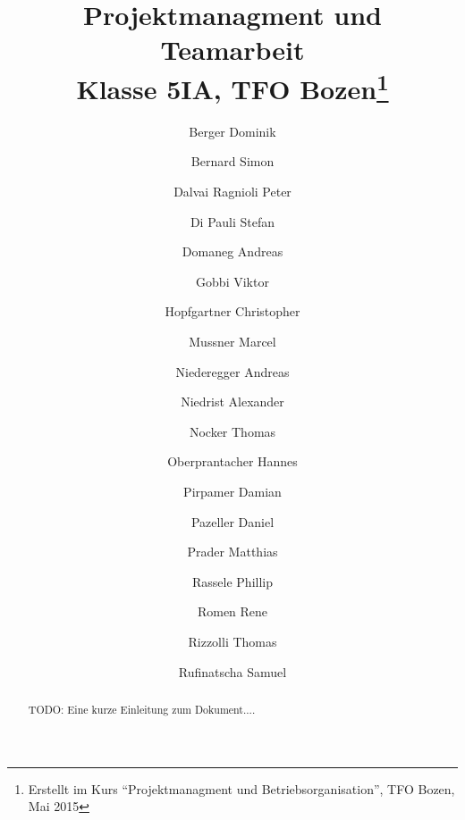 \documentclass{article}
\title{Projektmanagment und Teamarbeit\\Klasse 5IA, TFO Bozen\thanks{Erstellt 
im Kurs ``Projektmanagment und Betriebsorganisation'', TFO Bozen, Mai 2015}}
\author{Berger Dominik
\and Bernard Simon
\and Dalvai Ragnioli Peter
\and Di Pauli Stefan
\and Domaneg Andreas
\and Gobbi Viktor
\and Hopfgartner Christopher
\and Mussner Marcel
\and Niederegger Andreas
\and Niedrist Alexander
\and Nocker Thomas
\and Oberprantacher Hannes
\and Pirpamer Damian
\and Pazeller Daniel
\and Prader Matthias
\and Rassele Phillip
\and Romen Rene
\and Rizzolli Thomas
\and Rufinatscha Samuel}
\begin{document}
\maketitle


\begin{abstract}
 TODO: Eine kurze Einleitung zum Dokument....
\end{abstract}

\newpage


\begin{sloppypar}
\tableofcontents
\listoffigures























\end{sloppypar}
\end{document}

